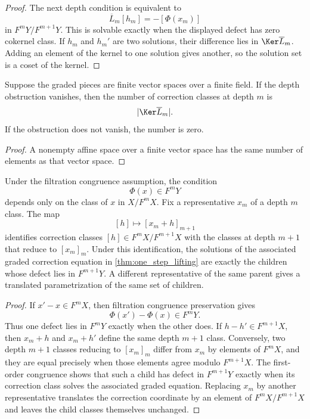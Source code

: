 \begin{proof}
The next depth condition is equivalent to
\[
\overline L_m[h_m]
=-[\Phi(x_m)]
\]
in $F^mY/F^{m+1}Y$.  This is solvable exactly when the displayed defect has zero cokernel class.  If $h_m$ and $h_m'$ are two solutions, their difference lies in $\Ker\overline L_m$.  Adding an element of the kernel to one solution gives another, so the solution set is a coset of the kernel.
\end{proof}

\begin{corollary}\label{cor:finite_branch_count}
Suppose the graded pieces are finite vector spaces over a finite field.  If the depth obstruction vanishes, then the number of correction classes at depth $m$ is
\[
|\Ker\overline L_m|.
\]
If the obstruction does not vanish, the number is zero.
\end{corollary}

\begin{proof}
A nonempty affine space over a finite vector space has the same number of elements as that vector space.
\end{proof}


\begin{lemma}\label{lem:well_defined_lift_classes}
Under the filtration congruence assumption, the condition
\[
\Phi(x)\in F^mY
\]
depends only on the class of $x$ in $X/F^mX$.  Fix a representative $x_m$ of a depth $m$ class.  The map
\[
[h]\longmapsto[x_m+h]_{m+1}
\]
identifies correction classes $[h]\in F^mX/F^{m+1}X$ with the classes at depth $m+1$ that reduce to $[x_m]_m$.  Under this identification, the solutions of the associated graded correction equation in \cref{thm:one_step_lifting} are exactly the children whose defect lies in $F^{m+1}Y$.  A different representative of the same parent gives a translated parametrization of the same set of children.
\end{lemma}

\begin{proof}
If $x'-x\in F^mX$, then filtration congruence preservation gives
\[
\Phi(x')-\Phi(x)\in F^mY.
\]
Thus one defect lies in $F^mY$ exactly when the other does.  If $h-h'\in F^{m+1}X$, then $x_m+h$ and $x_m+h'$ define the same depth $m+1$ class.  Conversely, two depth $m+1$ classes reducing to $[x_m]_m$ differ from $x_m$ by elements of $F^mX$, and they are equal precisely when those elements agree modulo $F^{m+1}X$.  The first-order congruence shows that such a child has defect in $F^{m+1}Y$ exactly when its correction class solves the associated graded equation.  Replacing $x_m$ by another representative translates the correction coordinate by an element of $F^mX/F^{m+1}X$ and leaves the child classes themselves unchanged.
\end{proof}

